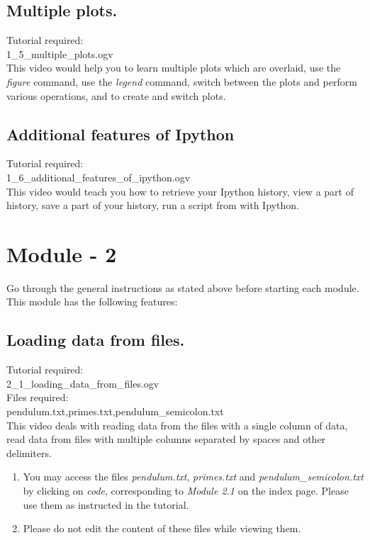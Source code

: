 \documentclass[11pt,twocolumn]{article}
\newenvironment{enumcpt}{\begin{enumerate} \topsep 0pt \partopsep 0pt 
                        \parsep 0pt
                        \itemsep 0pt \leftmargin -1in \rightmargin 0pt
                        }{\end{enumerate}}
\begin{document}
    \subsection{Multiple plots.}
    Tutorial required: \\ 1\_5\_multiple\_plots.ogv \\
      This video would help you to learn multiple plots which are overlaid, use the \emph{figure} command, use the \emph{legend} command, switch between the plots and perform various operations, and to create and switch plots. 

    \subsection{Additional features of Ipython}
     Tutorial required: \\ 1\_6\_additional\_features\_of\_ipython.ogv \\
    This video would teach you how to retrieve your Ipython history, view a part of history, save a part of your history, run a script from with Ipython. \\

\section{Module - 2}
Go through the general instructions as stated above before starting each module.\\
This module has the following features:
  \subsection{Loading data from files.}
  Tutorial required: \\ 2\_1\_loading\_data\_from\_files.ogv \\
  Files required:\\ pendulum.txt,primes.txt,pendulum\_semicolon.txt \\
  This video deals with reading data from the files with a single column of data, read data from files with multiple columns separated by spaces and other delimiters. 
\begin{enumcpt}
\item You may access the files \emph{pendulum.txt}, \emph{primes.txt} and \emph{pendulum\_semicolon.txt} by clicking on \emph{code}, corresponding to \emph{Module 2.1} on the index page. Please use them as instructed in the tutorial. 
\item Please do not edit the content of these files while viewing them.
\end{enumcpt}
\end{document}
